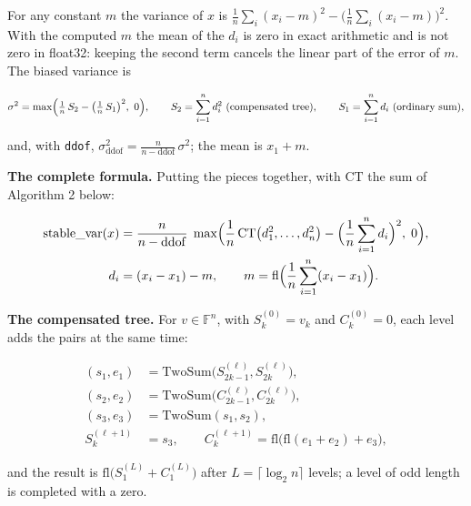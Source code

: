 \documentclass[11pt]{article}
\begin{document}
For any constant $m$ the variance of $x$ is $\frac{1}{n}\sum_i (x_i-m)^2 - \bigl(\frac{1}{n}\sum_i (x_i-m)\bigr)^2$. With the computed $m$ the mean of the $d_i$ is zero in exact arithmetic and is not zero in float32: keeping the second term cancels the linear part of the error of $m$. The biased variance is

\begin{equation}
\sigma^2 = \max\Bigl(\tfrac{1}{n}\,S_2 - \bigl(\tfrac{1}{n}\,S_1\bigr)^{2},\ 0\Bigr),
\qquad S_2 = \sum_{i=1}^{n} d_i^{2}\ \text{(compensated tree)},
\qquad S_1 = \sum_{i=1}^{n} d_i\ \text{(ordinary sum)},
\end{equation}

and, with \texttt{ddof}, $\sigma^2_{\mathrm{ddof}} = \frac{n}{n-\mathrm{ddof}}\,\sigma^2$; the mean is $x_1 + m$.

\textbf{The complete formula.} Putting the pieces together, with $\mathrm{CT}$ the sum of Algorithm 2 below:

\begin{equation}
\begin{aligned}
\mathrm{stable\_var}(x) &= \frac{n}{n-\mathrm{ddof}}\;
\max\Bigl(\frac{1}{n}\,\mathrm{CT}\bigl(d_1^{2},\dots,d_n^{2}\bigr) - \Bigl(\frac{1}{n}\sum_{i=1}^{n} d_i\Bigr)^{2},\; 0\Bigr),\\
d_i &= (x_i - x_1) - m, \qquad m = \mathrm{fl}\Bigl(\frac{1}{n}\sum_{i=1}^{n}(x_i - x_1)\Bigr).
\end{aligned}
\end{equation}

\textbf{The compensated tree.} For $v \in \mathbb{F}^n$, with $S^{(0)}_k = v_k$ and $C^{(0)}_k = 0$, each level adds the pairs at the same time:

\begin{equation}
\begin{aligned}
(s_1,e_1) &= \mathrm{TwoSum}\bigl(S^{(\ell)}_{2k-1},S^{(\ell)}_{2k}\bigr),\\
(s_2,e_2) &= \mathrm{TwoSum}\bigl(C^{(\ell)}_{2k-1},C^{(\ell)}_{2k}\bigr),\\
(s_3,e_3) &= \mathrm{TwoSum}(s_1,s_2),\\
S^{(\ell+1)}_{k} &= s_3, \qquad C^{(\ell+1)}_{k} = \mathrm{fl}\bigl(\mathrm{fl}(e_1+e_2)+e_3\bigr),
\end{aligned}
\end{equation}

and the result is $\mathrm{fl}\bigl(S^{(L)}_1 + C^{(L)}_1\bigr)$ after $L=\lceil \log_2 n\rceil$ levels; a level of odd length is completed with a zero.
\end{document}
